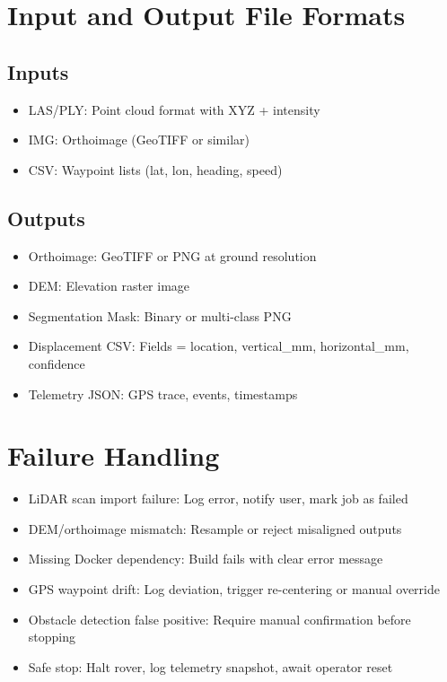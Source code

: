 \documentclass{article}
\begin{document}
\section{Input and Output File Formats}
\subsection{Inputs}
\begin{itemize}
  \item LAS/PLY: Point cloud format with XYZ + intensity
  \item IMG: Orthoimage (GeoTIFF or similar)
  \item CSV: Waypoint lists (lat, lon, heading, speed)
\end{itemize}

\subsection{Outputs}
\begin{itemize}
  \item Orthoimage: GeoTIFF or PNG at ground resolution
  \item DEM: Elevation raster image
  \item Segmentation Mask: Binary or multi-class PNG
  \item Displacement CSV: Fields = location, vertical\_mm, horizontal\_mm, confidence
  \item Telemetry JSON: GPS trace, events, timestamps
\end{itemize}

\section{Failure Handling}
\begin{itemize}
  \item LiDAR scan import failure: Log error, notify user, mark job as failed
  \item DEM/orthoimage mismatch: Resample or reject misaligned outputs
  \item Missing Docker dependency: Build fails with clear error message
  \item GPS waypoint drift: Log deviation, trigger re-centering or manual override
  \item Obstacle detection false positive: Require manual confirmation before stopping
  \item Safe stop: Halt rover, log telemetry snapshot, await operator reset
\end{itemize}
\end{document}
